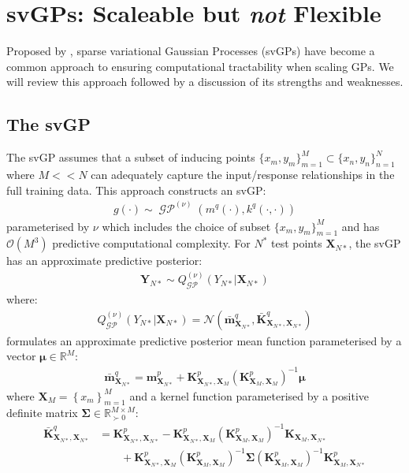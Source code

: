 \documentclass{article}
\newcommand{\GP}{\operatorname{\mathcal{GP}}}
\numberwithin{equation}{section}
\begin{document}
\newpage
\section{svGPs: Scaleable but \textit{not} Flexible}\label{section:the-svgp}
Proposed by \cite{titsias2009variational}, sparse variational Gaussian Processes (svGPs) have become a common approach to ensuring computational tractability when scaling GPs. We will review this approach followed by a discussion of its strengths and weaknesses.

\subsection{The svGP}
The svGP assumes that a subset of inducing points $\{x_m, y_m\}_{m=1}^{M} \subset \{x_n, y_n\}_{n=1}^{N}$ where $M << N$ can adequately capture the input/response relationships in the full training data. This approach constructs an svGP:
\begin{align}
g(\cdot) \sim \GP^{(\nu)}\left(m^{q}(\cdot), k^{q}(\cdot, \cdot)\right)
\label{svgp}
\end{align}
parameterised by $\nu$ which includes the choice of subset $\{x_m, y_m\}_{m=1}^{M}$ and has $\mathcal{O}(M^3)$ predictive computational complexity. For $N^*$ test points $\mathbf{X}_{N*}$, the svGP has an approximate predictive posterior:
\begin{align}
    \mathbf{Y}_{N*} \sim Q_{\GP}^{(\nu)}\left(Y_{N*} \vert \mathbf{X}_{N*}\right)
\end{align}
where:
\begin{align}
    Q_{\GP}^{(\nu)}\left(Y_{N*} \vert \mathbf{X}_{N*}\right) = \mathcal{N}\left(\bar{\mathbf{m}}_{\mathbf{X}_{N*}}^{q}, \bar{\mathbf{K}}_{\mathbf{X}_{N*}, \mathbf{X}_{N*}}^{q}\right)
\end{align}
\cite{titsias2009variational} formulates an approximate predictive posterior mean function parameterised by a vector $\boldsymbol{\mu} \in \mathbb{R}^M$:
\begin{align}
    \label{svgp-mean} 
    \bar{\mathbf{m}}_{\mathbf{X}_{N*}}^{q} = \mathbf{m}^p_{\mathbf{X}_{N*}} + \mathbf{K}^p_{\mathbf{X}_{N*}, \mathbf{X}_M}\left(\mathbf{K}^p_{\mathbf{X}_M,\mathbf{X}_M}\right)^{-1} \boldsymbol{\mu}
\end{align}
where $\mathbf{X}_M = \left\{ x_m\right\}_{m=1}^M$ and a kernel function parameterised by a positive definite matrix $\mathbf{\Sigma} \in \mathbb{R}^{M\times M}_{\succ 0}$:
\begin{align}
\bar{\mathbf{K}}_{\mathbf{X}_{N*}, \mathbf{X}_{N*}}^{q} & = \mathbf{K}^p_{\mathbf{X}_{N*}, \mathbf{X}_{N*}} - \mathbf{K}^p_{\mathbf{X}_{N*}, \mathbf{X}_M} \left(\mathbf{K}^p_{\mathbf{X}_M, \mathbf{X}_M}\right)^{-1}\mathbf{K}_{\mathbf{X}_M, \mathbf{X}_{N*}} \nonumber \\
&\qquad + \mathbf{K}^p_{\mathbf{X}_{N*}, \mathbf{X}_M}  \left(\mathbf{K}^p_{\mathbf{X}_M, \mathbf{X}_M}\right)  ^{-1} \mathbf{\Sigma} \left(\mathbf{K}^p_{\mathbf{X}_M, \mathbf{X}_M}\right)^{-1}\mathbf{K}^p_{\mathbf{X}_M, \mathbf{X}_{N*}}
\label{svgp-covariance}
\end{align}
\end{document}
